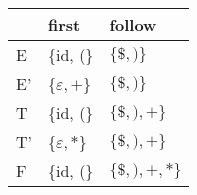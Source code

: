 \documentclass{standalone}
\providecommand\lightrule{%
	\arrayrulecolor{black!30}%
	\midrule[\lightrulewidth]%
	\arrayrulecolor{black}}
\begin{document}
\begin{tabularx}{\textwidth}{XXX}
    & first & follow\\
    \midrule
        E
        &
        \{id, (\}
        &
        \(\{\$, )\}\)
        \\ \lightrule
        E'
        &
        \{\(\varepsilon, +\)\}
        &
        \(\{\$, )\}\)
        \\ \lightrule
        T
        &
        \{id, (\}
        &
        \(\{\$, ), +\}\)
        \\ \lightrule
        T'
        &
        \{\(\varepsilon, *\)\}
        &
        \(\{\$, ), +\}\)
        \\ \lightrule
        F
        &
        \{id, (\}
        &
        \(\{\$, ), +, *\}\)
\end{tabularx}
\end{document}
